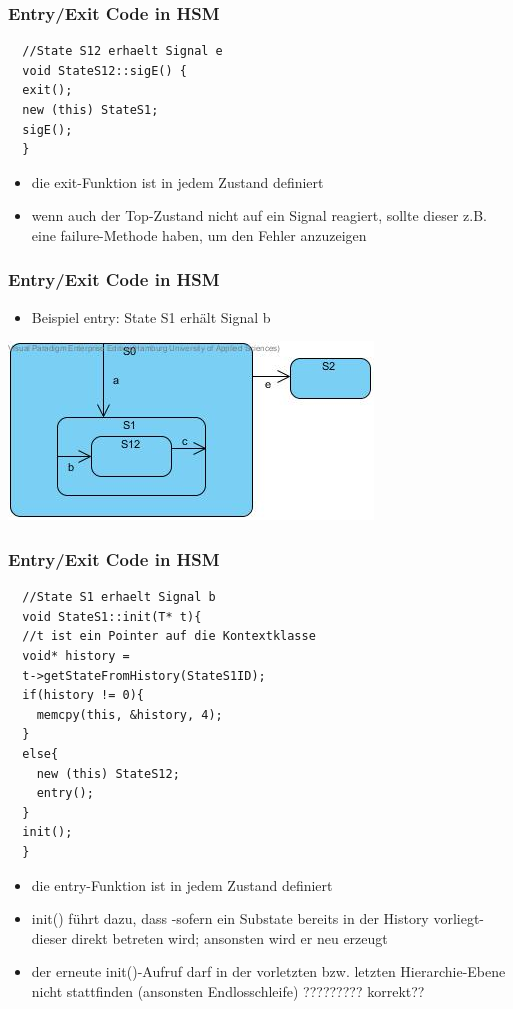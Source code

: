\documentclass{beamer}
\begin{document}
\begin{frame}[fragile]
  \frametitle{Entry/Exit Code in HSM }
  \begin{lstlisting}
  //State S12 erhaelt Signal e
  void StateS12::sigE() {
  exit();
  new (this) StateS1;
  sigE();
  }
  \end{lstlisting}
  \begin{itemize}
  \item die exit-Funktion ist in jedem Zustand definiert
  \item wenn auch der Top-Zustand nicht auf ein Signal reagiert, sollte dieser z.B. eine
  failure-Methode haben, um den Fehler anzuzeigen
  \end{itemize}
\end{frame}

\begin{frame}
  \frametitle{Entry/Exit Code in HSM  }
  \begin{itemize}
  \item Beispiel entry: State S1 erh\"alt Signal b
  \end{itemize}
  \includegraphics[scale=.6]{img/beispiel_entrySM}
\end{frame}

\begin{frame}[fragile]
  \frametitle{Entry/Exit Code in HSM }
  \begin{lstlisting}
  //State S1 erhaelt Signal b
  void StateS1::init(T* t){
  //t ist ein Pointer auf die Kontextklasse
  void* history =
  t->getStateFromHistory(StateS1ID);
  if(history != 0){
    memcpy(this, &history, 4);
  }
  else{
    new (this) StateS12;
    entry();
  }
  init();
  }
  \end{lstlisting}
\end{frame}

\begin{frame}[fragile]
  \begin{itemize}
  \item die entry-Funktion ist in jedem Zustand definiert
  \item init() f\"uhrt dazu, dass -sofern ein Substate bereits in der History vorliegt- dieser direkt betreten wird; ansonsten wird er neu erzeugt
  \item der erneute init()-Aufruf darf in der vorletzten bzw. letzten Hierarchie-Ebene nicht stattfinden (ansonsten Endlosschleife) ????????? korrekt??

  \end{itemize}
\end{frame}
\end{document}
